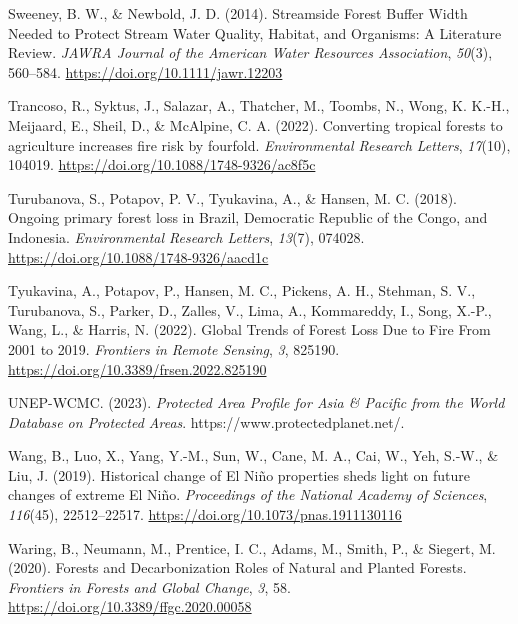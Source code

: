 \documentclass[
  letterpaper,
  DIV=11,
  numbers=noendperiod]{scrreprt}
\newlength{\cslhangindent}
\newlength{\cslentryspacingunit} %
\newenvironment{CSLReferences}[2] %
 {%
  \setlength{\parindent}{0pt}
  \ifodd #1
  \let\oldpar\par
  \def\par{\hangindent=\cslhangindent\oldpar}
  \fi
  \setlength{\parskip}{#2\cslentryspacingunit}
 }%
 {}
\begin{document}
\begin{CSLReferences}{1}{0}
\leavevmode{}%
Sweeney, B. W., \& Newbold, J. D. (2014). Streamside {Forest Buffer
Width Needed} to {Protect Stream Water Quality}, {Habitat}, and
{Organisms}: {A Literature Review}. \emph{JAWRA Journal of the American
Water Resources Association}, \emph{50}(3), 560--584.
\url{https://doi.org/10.1111/jawr.12203}

\leavevmode{}%
Trancoso, R., Syktus, J., Salazar, A., Thatcher, M., Toombs, N., Wong,
K. K.-H., Meijaard, E., Sheil, D., \& McAlpine, C. A. (2022). Converting
tropical forests to agriculture increases fire risk by fourfold.
\emph{Environmental Research Letters}, \emph{17}(10), 104019.
\url{https://doi.org/10.1088/1748-9326/ac8f5c}

\leavevmode{}%
Turubanova, S., Potapov, P. V., Tyukavina, A., \& Hansen, M. C. (2018).
Ongoing primary forest loss in {Brazil}, {Democratic Republic} of the
{Congo}, and {Indonesia}. \emph{Environmental Research Letters},
\emph{13}(7), 074028. \url{https://doi.org/10.1088/1748-9326/aacd1c}

\leavevmode{}%
Tyukavina, A., Potapov, P., Hansen, M. C., Pickens, A. H., Stehman, S.
V., Turubanova, S., Parker, D., Zalles, V., Lima, A., Kommareddy, I.,
Song, X.-P., Wang, L., \& Harris, N. (2022). Global {Trends} of {Forest
Loss Due} to {Fire From} 2001 to 2019. \emph{Frontiers in Remote
Sensing}, \emph{3}, 825190.
\url{https://doi.org/10.3389/frsen.2022.825190}

\leavevmode{}%
UNEP-WCMC. (2023). \emph{Protected {Area Profile} for {Asia} \&
{Pacific} from the {World Database} on {Protected Areas}}.
https://www.protectedplanet.net/.

\leavevmode{}%
Wang, B., Luo, X., Yang, Y.-M., Sun, W., Cane, M. A., Cai, W., Yeh,
S.-W., \& Liu, J. (2019). Historical change of {El Niño} properties
sheds light on future changes of extreme {El Niño}. \emph{Proceedings of
the National Academy of Sciences}, \emph{116}(45), 22512--22517.
\url{https://doi.org/10.1073/pnas.1911130116}

\leavevmode{}%
Waring, B., Neumann, M., Prentice, I. C., Adams, M., Smith, P., \&
Siegert, M. (2020). Forests and {Decarbonization} \textendash{} {Roles}
of {Natural} and {Planted Forests}. \emph{Frontiers in Forests and
Global Change}, \emph{3}, 58.
\url{https://doi.org/10.3389/ffgc.2020.00058}


\end{CSLReferences}
\end{document}
